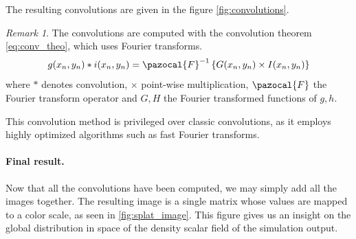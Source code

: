 \documentclass[
	a4paper,
	12pt,
	raggedright,
	twoside
]{tufte-style-article}
\theoremstyle{definition}
\theoremstyle{remark}
\newtheorem*{remark}{Remark}
\begin{document}
The resulting convolutions are given in the figure \ref{fig:convolutions}.

\begin{remark}
The convolutions are computed with the convolution theorem \ref{eq:conv_theo}, which uses Fourier transforms.
\begin{equation}\label{eq:conv_theo}
    g(x_n,y_n) * i(x_n,y_n) = \pazocal{F}^{-1} \left\{ G(x_n,y_n) \times I(x_n,y_n) \right\}
\end{equation}
where $*$ denotes convolution, $\times$ point-wise multiplication, $\pazocal{F}$ the Fourier transform operator and $G,H$ the Fourier transformed functions of $g,h$.

This convolution method is privileged over classic convolutions, as it employs highly optimized algorithms such as fast Fourier transforms.
\end{remark}
\begin{figure}
    \centering
    
\end{figure}
\begin{figure}
    \centering
    
\end{figure}

\begin{figure}
    \centering
    
\end{figure}
\paragraph{Final result.} Now that all the convolutions have been computed, we may simply add all the images together. The resulting image is a single matrix whose values are mapped to a color scale, as seen in \ref{fig:splat_image}. This figure gives us an insight on the global distribution in space of the density scalar field of the simulation output.
\end{document}
